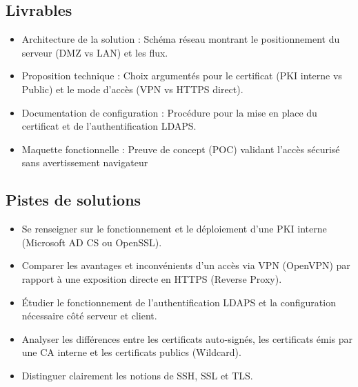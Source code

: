 \subsection*{Livrables}
{}
\begin{itemize}
  \item Architecture de la solution : Schéma réseau montrant le positionnement du serveur (DMZ vs LAN) et les flux.
  \item Proposition technique : Choix argumentés pour le certificat (PKI interne vs Public) et le mode d'accès (VPN vs HTTPS direct).
  \item Documentation de configuration : Procédure pour la mise en place du certificat et de l'authentification LDAPS.
  \item Maquette fonctionnelle : Preuve de concept (POC) validant l'accès sécurisé sans avertissement navigateur
\end{itemize}

\subsection*{Pistes de solutions}
{}
\begin{itemize}
  \item Se renseigner sur le fonctionnement et le déploiement d'une PKI interne (Microsoft AD CS ou OpenSSL).
  \item Comparer les avantages et inconvénients d'un accès via VPN (OpenVPN) par rapport à une exposition directe en HTTPS (Reverse Proxy).
  \item Étudier le fonctionnement de l'authentification LDAPS et la configuration nécessaire côté serveur et client.
  \item Analyser les différences entre les certificats auto-signés, les certificats émis par une CA interne et les certificats publics (Wildcard).
  \item Distinguer clairement les notions de SSH, SSL et TLS.
\end{itemize}

